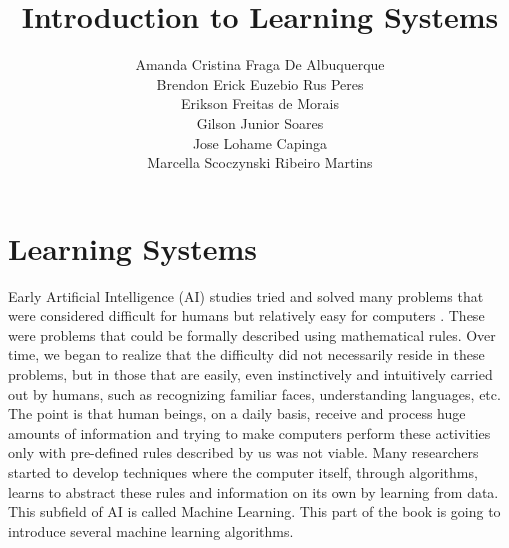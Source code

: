 \part{Learning Systems}
\thispagestyle{empty}

%

\title{Introduction to Learning Systems}
\label{chp:into-learning-systems}
\author{Amanda Cristina Fraga De Albuquerque\\
        Brendon Erick Euzebio Rus Peres\\
        Erikson Freitas de Morais\\
        Gilson Junior Soares\\
        Jose Lohame Capinga\\
        Marcella Scoczynski Ribeiro Martins}

%
\maketitle

Early Artificial Intelligence (AI) studies tried and solved many problems that were considered difficult for humans but relatively easy for computers \cite{goodfellow2016}. These were problems that could be formally described using mathematical rules. 
Over time, we began to realize that the difficulty did not necessarily reside in these problems, but in those that are easily, even instinctively and intuitively carried out by humans, such as recognizing familiar faces, understanding languages, etc. The point is that human beings, on a daily basis, receive and process huge amounts of information and trying to make computers perform these activities only with pre-defined rules described by us was not viable. Many researchers started to develop techniques where the computer itself, through algorithms, learns to abstract these rules and information on its own by learning from data. This subfield of AI is called Machine Learning. This part of the book is going to introduce several machine learning algorithms.


